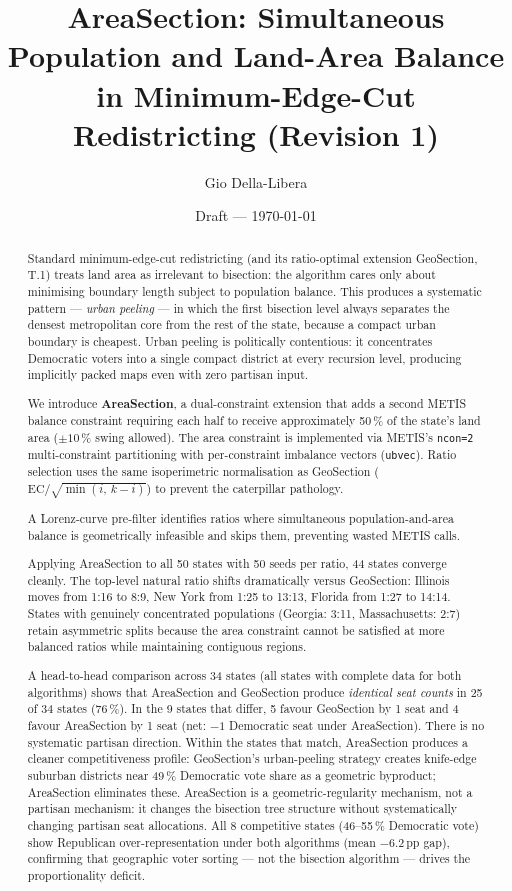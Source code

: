 \documentclass[12pt]{article}
\title{AreaSection: Simultaneous Population and Land-Area Balance\\
       in Minimum-Edge-Cut Redistricting (Revision 1)}
\author{Gio Della-Libera}
\date{Draft --- \today}
\begin{document}
\maketitle

\begin{abstract}
Standard minimum-edge-cut redistricting (and its ratio-optimal extension
GeoSection, T.1) treats land area as irrelevant to bisection: the algorithm
cares only about minimising boundary length subject to population balance.
This produces a systematic pattern --- \emph{urban peeling} --- in which the
first bisection level always separates the densest metropolitan core from the
rest of the state, because a compact urban boundary is cheapest.
Urban peeling is politically contentious: it concentrates Democratic voters
into a single compact district at every recursion level, producing implicitly
packed maps even with zero partisan input.

We introduce \textbf{AreaSection}, a dual-constraint extension that adds a
second METIS balance constraint requiring each half to receive approximately
50\,\% of the state's land area ($\pm 10$\,\% swing allowed).
The area constraint is implemented via METIS's \texttt{ncon=2} multi-constraint
partitioning with per-constraint imbalance vectors (\texttt{ubvec}).
Ratio selection uses the same isoperimetric normalisation as GeoSection
($\mathrm{EC}/\sqrt{\min(i,\,k-i)}$) to prevent the caterpillar pathology.

A Lorenz-curve pre-filter identifies ratios where simultaneous
population-and-area balance is geometrically infeasible and skips them,
preventing wasted METIS calls.

Applying AreaSection to all 50 states with 50 seeds per ratio,
44 states converge cleanly.
The top-level natural ratio shifts dramatically versus GeoSection:
Illinois moves from 1:16 to 8:9, New York from 1:25 to 13:13, Florida from
1:27 to 14:14.
States with genuinely concentrated populations (Georgia: 3:11, Massachusetts: 2:7)
retain asymmetric splits because the area constraint cannot be satisfied at
more balanced ratios while maintaining contiguous regions.

A head-to-head comparison across 34 states (all states with complete data
for both algorithms) shows that AreaSection and GeoSection produce
\emph{identical seat counts} in 25 of 34 states (76\,\%).
In the 9 states that differ, 5 favour GeoSection by 1 seat and 4 favour
AreaSection by 1 seat (net: $-1$ Democratic seat under AreaSection).
There is no systematic partisan direction.
Within the states that match, AreaSection produces a cleaner competitiveness
profile: GeoSection's urban-peeling strategy creates knife-edge suburban
districts near 49\,\% Democratic vote share as a geometric byproduct;
AreaSection eliminates these.
AreaSection is a geometric-regularity mechanism, not a partisan mechanism:
it changes the bisection tree structure without systematically changing partisan seat allocations.
All 8 competitive states (46--55\,\% Democratic vote) show Republican
over-representation under both algorithms (mean $-6.2$\,pp gap), confirming
that geographic voter sorting — not the bisection algorithm — drives the
proportionality deficit.
\end{abstract}










\end{document}
